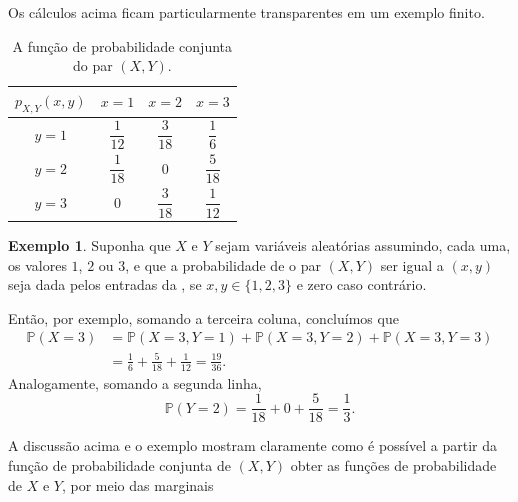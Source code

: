 \documentclass[12pt,portuguese]{article}
\theoremstyle{definition}
\newtheorem{example}[example]{Exemplo}
\begin{document}
\bigskip 

Os cálculos acima ficam particularmente transparentes em um exemplo finito.

\begin{table}[H]
\centering
\renewcommand{\arraystretch}{1.7}
\setlength{\tabcolsep}{18pt}
\begin{tabular}{cccc}
\toprule
$p_{X,Y}(x,y)$ & $x=1$ & $x=2$ & $x=3$ \\
\midrule
$y=1$ & $\dfrac{1}{12}$ & $\dfrac{3}{18}$ & $\dfrac{1}{6}$ \\[5pt]
$y=2$ & $\dfrac{1}{18}$ & $0$             & $\dfrac{5}{18}$ \\[5pt]
$y=3$ & $0$             & $\dfrac{3}{18}$ & $\dfrac{1}{12}$ \\[2pt]
\bottomrule
\end{tabular}
\vspace{0.25cm}
\caption{A função de probabilidade conjunta do par $(X,Y)$.}
\label{tab:conjunta-3-1}
\end{table}

\begin{example}\label{ex:conjunta-tabela-3-1}
Suponha que $X$ e $Y$ sejam variáveis aleatórias assumindo, cada uma, os
valores $1$, $2$ ou $3$, e que a probabilidade de o par $(X, Y)$ ser igual a
$(x, y)$ seja dada pelos entradas da , 
se $x,y\in \{1,2,3\}$ e zero caso contrário.

Então, por exemplo, somando a terceira coluna, concluímos que
\[
\begin{aligned}
  \mathbb{P}(X = 3) &= \mathbb{P}(X = 3, Y = 1) + \mathbb{P}(X = 3, Y = 2) + \mathbb{P}(X = 3, Y = 3) \\[0.3cm]
                    &= \frac{1}{6} + \frac{5}{18} + \frac{1}{12} = \frac{19}{36}.
\end{aligned}
\]
Analogamente, somando a segunda linha,
\[
  \mathbb{P}(Y = 2) = \frac{1}{18} + 0 + \frac{5}{18} = \frac{1}{3}.
\]
\end{example}

A discussão acima e o exemplo mostram claramente como é possível 
a partir da função de probabilidade conjunta de $(X,Y)$ obter 
as funções de probabilidade de $X$ e $Y$, por meio das marginais
\end{document}
